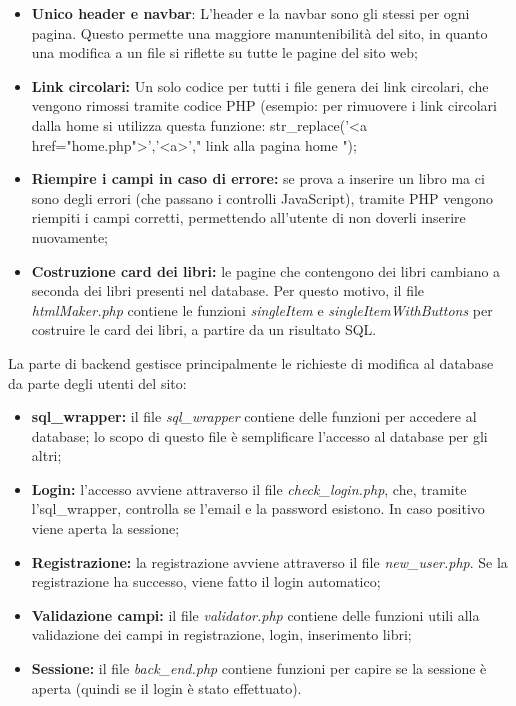 \begin{itemize}
    \item \textbf{Unico header e navbar}: L'header e la navbar sono gli stessi per ogni pagina. Questo permette una maggiore manuntenibilità del sito, in quanto una modifica a un file si riflette su tutte le pagine del sito web;
    \item \textbf{Link circolari:} Un solo codice per tutti i file genera dei link circolari, che vengono rimossi tramite codice PHP (esempio: per rimuovere i link circolari dalla home si utilizza questa funzione: str\_replace('<a href="home.php">','<a>',"\- link alla pagina home \-");
    \item \textbf{Riempire i campi in caso di errore:} se prova a inserire un libro ma ci sono degli errori (che passano i controlli JavaScript), tramite PHP vengono riempiti i campi corretti, permettendo all'utente di non doverli inserire nuovamente;
    \item \textbf{Costruzione card dei libri:} le pagine che contengono dei libri cambiano a seconda dei libri presenti nel database. Per questo motivo, il file \textit{htmlMaker.php} contiene le funzioni \textit{singleItem} e \textit{singleItemWithButtons} per costruire le card dei libri, a partire da un risultato SQL.
\end{itemize}
La parte di backend gestisce principalmente le richieste di modifica al database da parte degli utenti del sito:
\begin{itemize}
    \item \textbf{sql\_wrapper:} il file \textit{sql\_wrapper} contiene delle funzioni per accedere al database; lo scopo di questo file è semplificare l'accesso al database per gli altri;  
    \item \textbf{Login:} l'accesso avviene attraverso il file \textit{check\_login.php}, che, tramite l'sql\_wrapper, controlla se l'email e la password esistono. In caso positivo viene aperta la sessione;
    \item \textbf{Registrazione:} la registrazione avviene attraverso il file \textit{new\_user.php}. Se la registrazione ha successo, viene fatto il login automatico;
    \item \textbf{Validazione campi:} il file \textit{validator.php} contiene delle funzioni utili alla validazione dei campi in registrazione, login, inserimento libri;
    \item \textbf{Sessione:} il file \textit{back\_end.php} contiene funzioni per capire se la sessione è aperta (quindi se il login è stato effettuato).
\end{itemize}